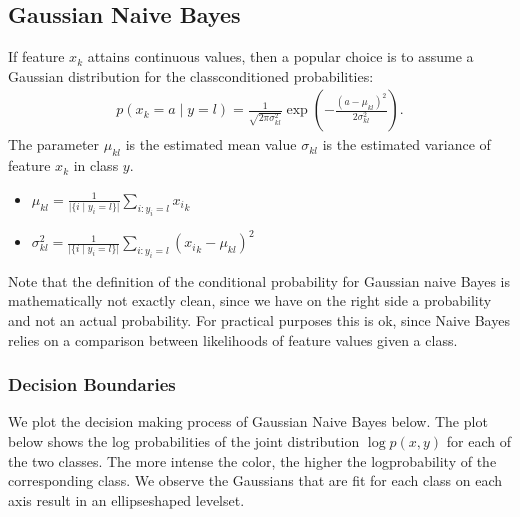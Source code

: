 \documentclass[letterpaper,10pt,english]{jupyterBook}
\begin{document}
\subsection{Gaussian Naive Bayes}
\label{\detokenize{classification_naive_bayes:gaussian-naive-bayes}}
\sphinxAtStartPar
If feature \(x_k\) attains continuous values, then a popular choice is to assume a Gaussian distribution for the class\sphinxhyphen{}conditioned probabilities:
\begin{align*}
p(x_k = a\mid y=l) = \frac{1}{\sqrt{2\pi \sigma_{kl}^2}}\exp\left(-\frac{(a-\mu_{kl})^2}{2\sigma_{kl}^2}\right).
\end{align*}
\sphinxAtStartPar
The parameter \(\mu_{kl}\) is the estimated mean value \(\sigma_{kl}\) is the estimated variance of feature \(x_k\) in class \(y\).
\begin{itemize}
\item {} 
\sphinxAtStartPar
\(\mu_{kl} = \frac{1}{\lvert\{i\mid y_i=l\}\rvert}\sum_{i:y_i=l} {x_i}_k \)

\item {} 
\sphinxAtStartPar
\(\sigma_{kl}^2 = \frac{1}{\lvert\{i\mid y_i=l\}\rvert} \sum_{i:y_i=l} ({x_i}_k-\mu_{kl})^2\)

\end{itemize}

\sphinxAtStartPar
Note that the definition of the conditional probability for Gaussian naive Bayes is mathematically not exactly clean, since we have on the right side a probability  and not an actual probability. For practical purposes this is ok, since Naive Bayes relies on a comparison between likelihoods of feature values given a class.


\subsubsection{Decision Boundaries}
\label{\detokenize{classification_naive_bayes:decision-boundaries}}
\sphinxAtStartPar
We plot the decision making process of Gaussian Naive Bayes below. The plot below shows the log probabilities of the joint distribution \(\log p(x,y)\) for each of the two classes. The more intense the color, the higher the log\sphinxhyphen{}probability of the corresponding class. We observe the Gaussians that are fit for each class on each axis result in an ellipse\sphinxhyphen{}shaped levelset.
\end{document}
